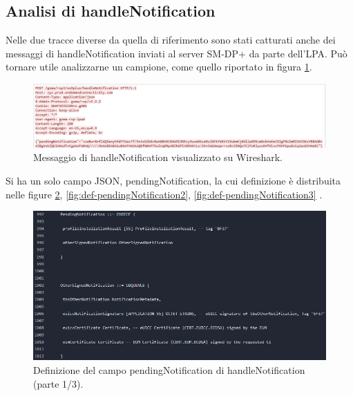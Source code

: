 \documentclass[10pt, oneside]{book}
\begin{document}
\subsection{Analisi di handleNotification}
Nelle due tracce diverse da quella di riferimento sono stati catturati anche dei messaggi di handleNotification inviati al server SM-DP+ da parte dell'LPA. Può tornare utile analizzarne un campione, come quello riportato in figura \ref{fig:msg7-stream-pcap}.\\
\begin{figure}
\includegraphics[width=\linewidth]{msg7-stream-pcap.png}
\caption{Messaggio di handleNotification visualizzato su Wireshark.}
\label{fig:msg7-stream-pcap}
\end{figure}
Si ha un solo campo JSON, pendingNotification, la cui definizione è distribuita nelle figure \ref{fig:def-pendingNotification1}, \ref{fig:def-pendingNotification2}, \ref{fig:def-pendingNotification3} \cite{RSP-definitions}.\\
\begin{figure}
\includegraphics[width=\linewidth]{def-pendingNotification1.png}
\caption{Definizione del campo pendingNotification di handleNotification (parte 1/3).}
\label{fig:def-pendingNotification1}
\end{figure}
\end{document}
